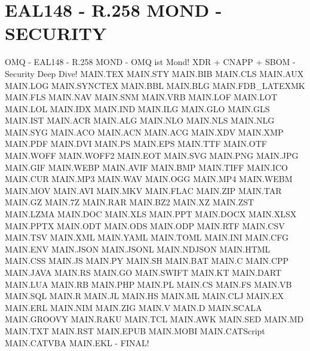 \documentclass{MAIN}
\begin{document}
\section*{EAL148 - R.258 MOND - SECURITY}
OMQ - EAL148 - R.258 MOND - OMQ ist Mond!
XDR + CNAPP + SBOM - Security Deep Dive!
MAIN.TEX MAIN.STY MAIN.BIB MAIN.CLS MAIN.AUX MAIN.LOG MAIN.SYNCTEX MAIN.BBL MAIN.BLG MAIN.FDB_LATEXMK MAIN.FLS MAIN.NAV MAIN.SNM MAIN.VRB MAIN.LOF MAIN.LOT MAIN.LOL MAIN.IDX MAIN.IND MAIN.ILG MAIN.GLO MAIN.GLS MAIN.IST MAIN.ACR MAIN.ALG MAIN.NLO MAIN.NLS MAIN.NLG MAIN.SYG MAIN.ACO MAIN.ACN MAIN.ACG MAIN.XDV MAIN.XMP MAIN.PDF MAIN.DVI MAIN.PS MAIN.EPS MAIN.TTF MAIN.OTF MAIN.WOFF MAIN.WOFF2 MAIN.EOT MAIN.SVG MAIN.PNG MAIN.JPG MAIN.GIF MAIN.WEBP MAIN.AVIF MAIN.BMP MAIN.TIFF MAIN.ICO MAIN.CUR MAIN.MP3 MAIN.WAV MAIN.OGG MAIN.MP4 MAIN.WEBM MAIN.MOV MAIN.AVI MAIN.MKV MAIN.FLAC MAIN.ZIP MAIN.TAR MAIN.GZ MAIN.7Z MAIN.RAR MAIN.BZ2 MAIN.XZ MAIN.ZST MAIN.LZMA MAIN.DOC MAIN.XLS MAIN.PPT MAIN.DOCX MAIN.XLSX MAIN.PPTX MAIN.ODT MAIN.ODS MAIN.ODP MAIN.RTF MAIN.CSV MAIN.TSV MAIN.XML MAIN.YAML MAIN.TOML MAIN.INI MAIN.CFG MAIN.ENV MAIN.JSON MAIN.JSONL MAIN.NDJSON MAIN.HTML MAIN.CSS MAIN.JS MAIN.PY MAIN.SH MAIN.BAT MAIN.C MAIN.CPP MAIN.JAVA MAIN.RS MAIN.GO MAIN.SWIFT MAIN.KT MAIN.DART MAIN.LUA MAIN.RB MAIN.PHP MAIN.PL MAIN.CS MAIN.FS MAIN.VB MAIN.SQL MAIN.R MAIN.JL MAIN.HS MAIN.ML MAIN.CLJ MAIN.EX MAIN.ERL MAIN.NIM MAIN.ZIG MAIN.V MAIN.D MAIN.SCALA MAIN.GROOVY MAIN.RAKU MAIN.TCL MAIN.AWK MAIN.SED MAIN.MD MAIN.TXT MAIN.RST MAIN.EPUB MAIN.MOBI MAIN.CATScript MAIN.CATVBA MAIN.EKL - FINAL!
\end{document}
